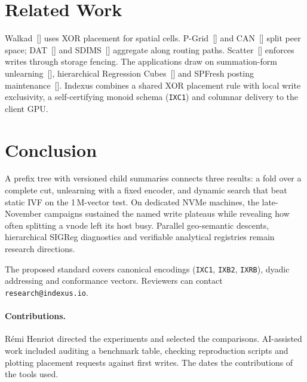 \documentclass[11pt]{article}
\begin{document}
\section{Related Work}
Walkad~[] uses XOR placement for spatial cells. P-Grid~[] and CAN~[] split peer space; DAT~[] and SDIMS~[] aggregate along routing paths. Scatter~[] enforces writes through storage fencing. The applications draw on summation-form unlearning~[], hierarchical Regression Cubes~[] and SPFresh posting maintenance~[]. Indexus combines a shared XOR placement rule with local write exclusivity, a self-certifying monoid schema (\texttt{IXC1}) and columnar delivery to the client GPU.

\section{Conclusion}
A prefix tree with versioned child summaries connects three results: a fold over a complete cut, unlearning with a fixed encoder, and dynamic search that beat static IVF on the 1\,M-vector test. On dedicated NVMe machines, the late-November campaigns sustained the named write plateaus while revealing how often splitting a vnode left its host busy. Parallel geo-semantic descents, hierarchical SIGReg diagnostics and verifiable analytical registries remain research directions.

The proposed standard covers canonical encodings (\texttt{IXC1}, \texttt{IXB2}, \texttt{IXRB}), dyadic addressing and conformance vectors. Reviewers can contact \texttt{research@indexus.io}.

\paragraph{Contributions.} Rémi Henriot directed the experiments and selected the comparisons. AI-assisted work included auditing a benchmark table, checking reproduction scripts and plotting placement requests against first writes. The  dates the contributions of the tools used.

\end{document}
